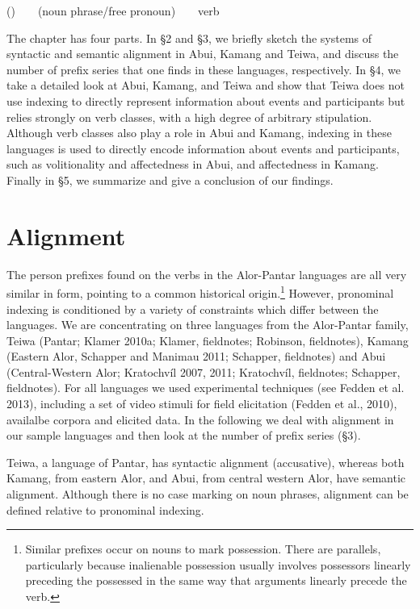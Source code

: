 \label{bkm:Ref306281880}()\ \ \ \ (noun phrase/free pronoun)\ \ \ \ verb

The chapter has four parts. In {\S}2 and {\S}3, we briefly sketch the systems of syntactic and semantic alignment in Abui, Kamang and Teiwa, and discuss the number of prefix series that one finds in these languages, respectively. In {\S}4, we take a detailed look at Abui, Kamang, and Teiwa and show that Teiwa does not use indexing to directly represent information about events and participants but relies strongly on verb classes, with a high degree of arbitrary stipulation. Although verb classes also play a role in Abui and Kamang, indexing in these languages is used to directly encode information about events and participants, such as volitionality and affectedness in Abui, and affectedness in Kamang. Finally in {\S}5, we summarize and give a conclusion of our findings.

\section[Alignment]{Alignment}
The person prefixes found on the verbs in the Alor-Pantar languages are all very similar in form, pointing to a common historical origin.\footnote{Similar prefixes occur on nouns to mark possession. There are parallels, particularly because inalienable possession usually involves possessors linearly preceding the possessed in the same way that arguments linearly precede the verb.} However, pronominal indexing is conditioned by a variety of constraints which differ between the languages. We are concentrating on three languages from the Alor-Pantar family, Teiwa (Pantar; Klamer 2010a; Klamer, fieldnotes; Robinson, fieldnotes), Kamang (Eastern Alor, Schapper and Manimau 2011; Schapper, fieldnotes) and Abui (Central-Western Alor; Kratochv\'il 2007, 2011; Kratochv\'il, fieldnotes; Schapper, fieldnotes). For all languages we used experimental techniques (see Fedden et al. 2013), including a set of video stimuli for field elicitation (Fedden et al., 2010), availalbe corpora and elicited data. In the following we 
deal with alignment in our sample languages and then look at the number of prefix series ({\S}3). 

Teiwa, a language of Pantar, has syntactic alignment (accusative), whereas both Kamang, from eastern Alor, and Abui, from central western Alor, have semantic alignment. Although there is no case marking on noun phrases, alignment can be defined relative to pronominal indexing. 

